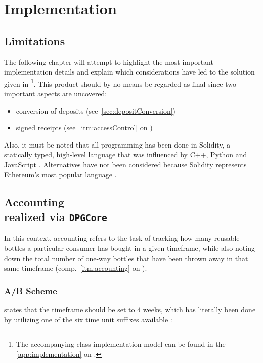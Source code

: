 
\chapter{Implementation}
\label{chp:implementation}

\section{Limitations}
The following chapter will attempt to highlight the most important implementation details and explain which considerations have led to the solution given in \cite{depositRefundGitHub} \footnote{The accompanying class implementation model can be found in the \autoref{app:implementation} on .}. This product should by no means be regarded as final since two important aspects are uncovered:

\begin{itemize}
  \item conversion of deposits (see~\ref{sec:depositConversion})
  \item signed receipts (see~\ref{itm:accessControl} on )
\end{itemize}

Also, it must be noted that all programming has been done in Solidity, a statically typed, high-level language that was influenced by C++, Python and JavaScript \cite[p.~5]{solidityDocs}. Alternatives have not been considered because Solidity represents Ethereum's most popular language \cite[p.~21]{Antonopoulos.2018}.

\pagebreak

\section[Accounting]{Accounting \\ {\normalsize realized via \texttt{DPGCore}}}

In this context, accounting refers to the task of tracking how many reusable bottles a particular consumer has bought in a given timeframe, while also noting down the total number of one-way bottles that have been thrown away in that same timeframe (comp.~\ref{itm:accounting} on ). 

\subsection{A/B Scheme}
 states that the timeframe should be set to 4 weeks, which has literally been done by utilizing one of the six time unit suffixes available \cite[p.~68]{solidityDocs}:

